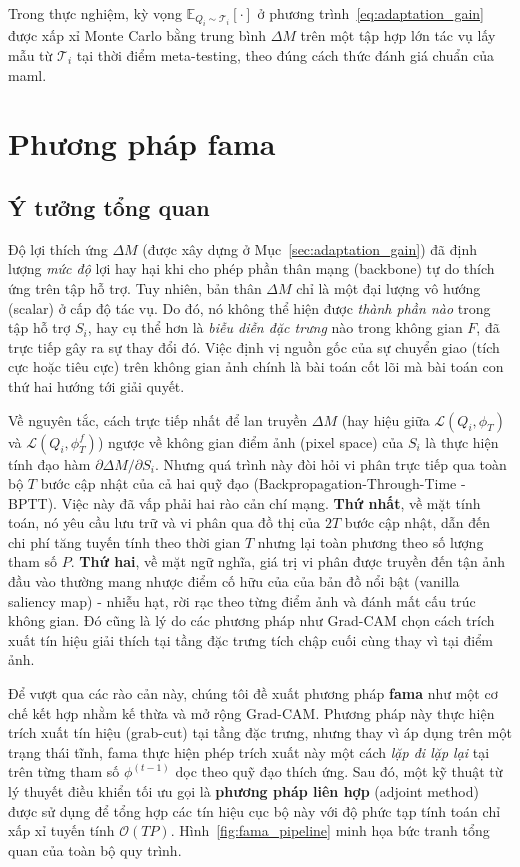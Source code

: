 Trong thực nghiệm, kỳ vọng $\mathbb{E}_{Q_i \sim \mathcal{T}_i}[\cdot]$ ở phương trình~\eqref{eq:adaptation_gain} được xấp xỉ Monte Carlo bằng trung bình $\Delta M$ trên một tập hợp lớn tác vụ lấy mẫu từ $\mathcal{T}_i$ tại thời điểm meta-testing, theo đúng cách thức đánh giá chuẩn của \acrshort{maml}.

\section{Phương pháp \acrfull{fama}}
\label{sec:fama}

\subsection{Ý tưởng tổng quan}
\label{subsec:fama_overview}
Độ lợi thích ứng $\Delta M$ (được xây dựng ở Mục~\ref{sec:adaptation_gain}) đã định lượng \emph{mức độ} lợi hay hại khi cho phép phần thân mạng (backbone) tự do thích ứng trên tập hỗ trợ. Tuy nhiên, bản thân $\Delta M$ chỉ là một đại lượng vô hướng (scalar) ở cấp độ tác vụ. Do đó, nó không thể hiện được \emph{thành phần nào} trong tập hỗ trợ $S_i$, hay cụ thể hơn là \emph{biễu diễn đặc trưng} nào trong không gian $F$, đã trực tiếp gây ra sự thay đổi đó. Việc định vị nguồn gốc của sự chuyển giao (tích cực hoặc tiêu cực) trên không gian ảnh chính là bài toán cốt lõi mà bài toán con thứ hai hướng tới giải quyết.

Về nguyên tắc, cách trực tiếp nhất để lan truyền $\Delta M$ (hay hiệu giữa $\mathcal{L}(Q_i,\phi_T)$ và $\mathcal{L}(Q_i,\phi_T^f)$) ngược về không gian điểm ảnh (pixel space) của $S_i$ là thực hiện tính đạo hàm $\partial \Delta M / \partial S_i$. Nhưng quá trình này đòi hỏi vi phân trực tiếp qua toàn bộ $T$ bước cập nhật của cả hai quỹ đạo (Backpropagation-Through-Time - BPTT). Việc này đã vấp phải hai rào cản chí mạng. \textbf{Thứ nhất}, về mặt tính toán, nó yêu cầu lưu trữ và vi phân qua đồ thị của $2T$ bước cập nhật, dẫn đến chi phí tăng tuyến tính theo thời gian $T$ nhưng lại toàn phương theo số lượng tham số $P$. \textbf{Thứ hai}, về mặt ngữ nghĩa, giá trị vi phân được truyền đến tận ảnh đầu vào thường mang nhược điểm cố hữu của của bản đồ nổi bật (vanilla saliency map) \cite{simonyan2014visualising} - nhiễu hạt, rời rạc theo từng điểm ảnh và đánh mất cấu trúc không gian. Đó cũng là lý do các phương pháp như Grad-CAM \cite{selvaraju2020grad} chọn cách trích xuất tín hiệu giải thích tại tầng đặc trưng tích chập cuối cùng thay vì tại điểm ảnh.

Để vượt qua các rào cản này, chúng tôi đề xuất phương pháp \textbf{\acrfull{fama}} như một cơ chế kết hợp nhằm kế thừa và mở rộng Grad-CAM. Phương pháp này thực hiện trích xuất tín hiệu (grab-cut) tại tầng đặc trưng, nhưng thay vì áp dụng trên một trạng thái tĩnh, \acrshort{fama} thực hiện phép trích xuất này một cách \emph{lặp đi lặp lại} tại trên từng tham số $\phi^{(t-1)}$ dọc theo quỹ đạo thích ứng. Sau đó, một kỹ thuật từ lý thuyết điều khiển tối ưu \cite{pontryagin1962mathematical} gọi là \textbf{phương pháp liên hợp} (adjoint method) được sử dụng để tổng hợp các tín hiệu cục bộ này với độ phức tạp tính toán chỉ xấp xỉ tuyến tính $\mathcal{O}(TP)$. Hình~\ref{fig:fama_pipeline} minh họa bức tranh tổng quan của toàn bộ quy trình.

